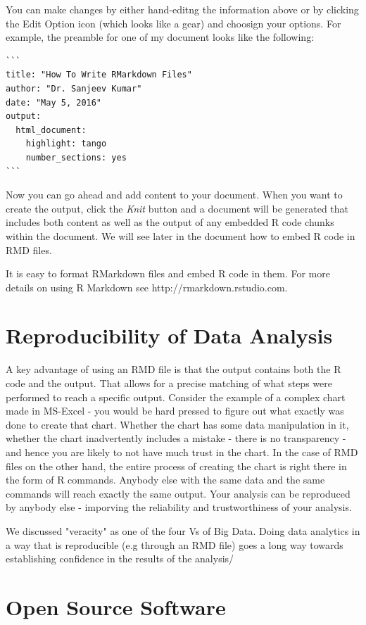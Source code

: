 \documentclass[11pt, letterpaper, twoside]{memoir}\usepackage{knitr}
\begin{document}
You can make changes by either hand-editng the information above or by clicking the Edit Option icon (which looks like a gear) and choosign your options. For example, the preamble for one of my document looks like the following:

\begin{verbatim}
```
title: "How To Write RMarkdown Files"
author: "Dr. Sanjeev Kumar"
date: "May 5, 2016"
output:
  html_document: 
    highlight: tango
    number_sections: yes
```
\end{verbatim}

Now you can go ahead and add content to your document. When you want to create the output,  click the \emph{Knit} button and a document will be generated that includes both content as well as the output of any embedded R code chunks within the document. We will see later in the document how to embed R code in RMD files.

It is easy to format RMarkdown files and embed R code in them. For more details on using R Markdown see http://rmarkdown.rstudio.com.

\section{Reproducibility of Data Analysis}

A key advantage of using an RMD file is that the output contains both the R code and the output. That allows for a precise matching of what steps were performed to reach a specific output. Consider the example of a complex chart made in MS-Excel - you would be hard pressed to figure out what exactly was done to create that chart. Whether the chart has some data manipulation in it, whether the chart inadvertently includes a mistake - there is no transparency - and hence you are likely to not have much trust in the chart. In the case of RMD files on the other hand, the entire process of creating the chart is right there in the form of R commands. Anybody else with the same data and the same commands will reach exactly the same output. Your analysis can be reproduced by anybody else - imporving the reliability and trustworthiness of your analysis.

We discussed "veracity" as one of the four Vs of Big Data. Doing data analytics in a way that is reproducible (e.g through an RMD file) goes a long way towards establishing confidence in the results of the analysis/

\section{Open Source Software}
\end{document}
